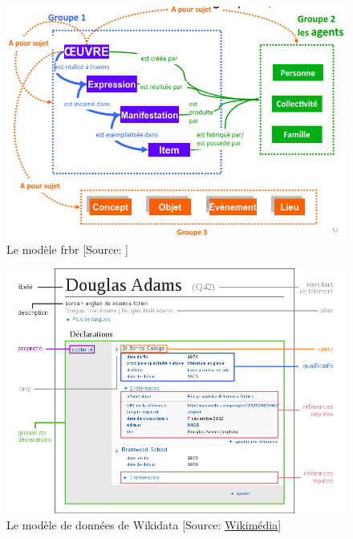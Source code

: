 \begin{figure}[!h]
	\centering
	\includegraphics[width=16cm]{images/frbr_slide.png}
	\caption[Le modèle \ac{frbr}]{Le modèle \ac{frbr} [Source: \cite[s.52]{benezet_participer_2015}]}
	\label{frbr}
\end{figure}

\begin{figure}[!h]
	\centering
	\includegraphics[width=16cm]{images/modele_wikidata.png}
	\caption[Le modèle de données de Wikidata]{Le modèle de données de Wikidata [Source: \href{https://upload.wikimedia.org/wikipedia/commons/thumb/c/ce/Datamodel_in_Wikidata_fr.svg/330px-Datamodel_in_Wikidata_fr.svg.png}{Wikimédia}]}
	\label{wikidata}
\end{figure}

